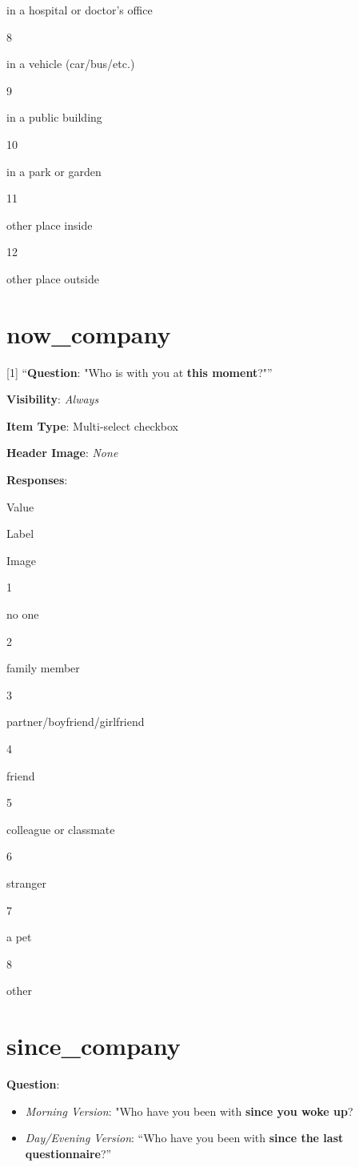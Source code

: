 \documentclass[]{book}
\providecommand{\tightlist}{%
  \setlength{\itemsep}{0pt}\setlength{\parskip}{0pt}}
\begin{document}
in a hospital or doctor's office

8

in a vehicle (car/bus/etc.)

9

in a public building

10

in a park or garden

11

other place inside

12

other place outside

\hypertarget{now_company}{%
\section{now\_company}\label{now_company}}

{[}1{]} ``\textbf{Question}: "Who is with you at \textbf{this moment}?"''

\textbf{Visibility}: \emph{Always}

\textbf{Item Type}: Multi-select checkbox

\textbf{Header Image}: \emph{None}

\textbf{Responses}:

Value

Label

Image

1

no one

2

family member

3

partner/boyfriend/girlfriend

4

friend

5

colleague or classmate

6

stranger

7

a pet

8

other

\hypertarget{since_company}{%
\section{since\_company}\label{since_company}}

\textbf{Question}:

\begin{itemize}
\tightlist
\item
  \emph{Morning Version}: "Who have you been with \textbf{since you woke up}?
\item
  \emph{Day/Evening Version}: ``Who have you been with \textbf{since the last questionnaire}?''
\end{itemize}
\end{document}

